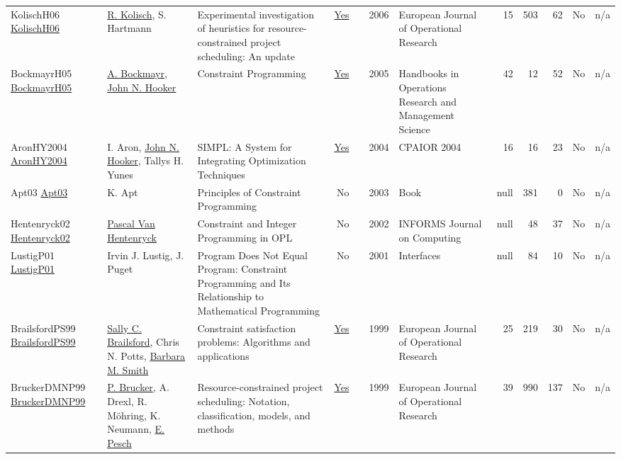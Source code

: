 {\begin{longtable}{>{\raggedright\arraybackslash}p{3cm}>{\raggedright\arraybackslash}p{6cm}>{\raggedright\arraybackslash}p{6.5cm}rrrp{2.5cm}rrrrr}
KolischH06 \href{http://dx.doi.org/10.1016/j.ejor.2005.01.065}{KolischH06} & \hyperref[auth:a443]{R. Kolisch}, S. Hartmann & Experimental investigation of heuristics for resource-constrained project scheduling: An update & \href{../works/KolischH06.pdf}{Yes} & \cite{KolischH06} & 2006 & European Journal of Operational Research & 15 & 503 & 62 & No & n/a\\
BockmayrH05 \href{http://dx.doi.org/10.1016/s0927-0507(05)12010-6}{BockmayrH05} & \hyperref[auth:a913]{A. Bockmayr}, \hyperref[auth:a161]{John N. Hooker} & Constraint Programming & \href{../works/BockmayrH05.pdf}{Yes} & \cite{BockmayrH05} & 2005 & Handbooks in Operations Research and Management Science & 42 & 12 & 52 & No & n/a\\
AronHY2004 \href{http://dx.doi.org/10.1007/978-3-540-24664-0_2}{AronHY2004} & I. Aron, \hyperref[auth:a161]{John N. Hooker}, Tallys H. Yunes & SIMPL: A System for Integrating Optimization Techniques & \href{../works/AronHY2004.pdf}{Yes} & \cite{AronHY2004} & 2004 & CPAIOR 2004 & 16 & 16 & 23 & No & n/a\\
Apt03 \href{http://dx.doi.org/10.1017/cbo9780511615320}{Apt03} & K. Apt & Principles of Constraint Programming & No & \cite{Apt03} & 2003 & Book & null & 381 & 0 & No & n/a\\
Hentenryck02 \href{http://dx.doi.org/10.1287/ijoc.14.4.345.2826}{Hentenryck02} & \hyperref[auth:a149]{Pascal Van Hentenryck} & Constraint and Integer Programming in OPL & No & \cite{Hentenryck02} & 2002 & INFORMS Journal on Computing & null & 48 & 37 & No & n/a\\
LustigP01 \href{http://dx.doi.org/10.1287/inte.31.6.29.9647}{LustigP01} & Irvin J. Lustig, J. Puget & Program Does Not Equal Program: Constraint Programming and Its Relationship to Mathematical Programming & No & \cite{LustigP01} & 2001 & Interfaces & null & 84 & 10 & No & n/a\\
BrailsfordPS99 \href{http://dx.doi.org/10.1016/s0377-2217(98)00364-6}{BrailsfordPS99} & \hyperref[auth:a1063]{Sally C. Brailsford}, Chris N. Potts, \hyperref[auth:a1065]{Barbara M. Smith} & Constraint satisfaction problems: Algorithms and applications & \href{../works/BrailsfordPS99.pdf}{Yes} & \cite{BrailsfordPS99} & 1999 & European Journal of Operational Research & 25 & 219 & 30 & No & n/a\\
BruckerDMNP99 \href{http://dx.doi.org/10.1016/s0377-2217(98)00204-5}{BruckerDMNP99} & \hyperref[auth:a851]{P. Brucker}, A. Drexl, R. M\"{o}hring, K. Neumann, \hyperref[auth:a441]{E. Pesch} & Resource-constrained project scheduling: Notation, classification, models, and methods & \href{../works/BruckerDMNP99.pdf}{Yes} & \cite{BruckerDMNP99} & 1999 & European Journal of Operational Research & 39 & 990 & 137 & No & n/a\\

\end{longtable}}
